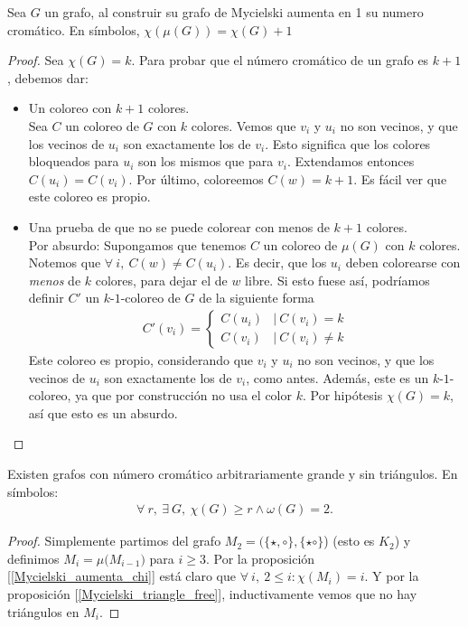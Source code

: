 \begin{proposition}\label{Mycielski_aumenta_chi}
Sea $G$ un grafo, al construir su grafo de Mycielski aumenta en 1 su numero cromático. En símbolos,
$\chi({\mu(G)}) = \chi(G) + 1$
\end{proposition}

\begin{proof}
Sea $\chi(G) = k$. Para probar que el número cromático de un grafo es $k+1$, debemos dar:
\begin{itemize}
    \item Un coloreo con $k+1$ colores.\\
    Sea $C$ un coloreo de $G$ con $k$ colores. Vemos que $v_i$ y $u_i$ no son vecinos, y que los vecinos de $u_i$ son exactamente los de $v_i$. Esto significa que los colores bloqueados para $u_i$ son los mismos que para $v_i$. Extendamos entonces $C(u_i) = C(v_i)$. Por último, coloreemos $C(w) = k+1$. Es fácil ver que este coloreo es propio.
    
    \item Una prueba de que no se puede colorear con menos de $k+1$ colores.\\
    Por absurdo: Supongamos que tenemos $C$ un coloreo de $\mu(G)$ con $k$ colores. Notemos que $\forall~ i,~ C(w) \neq C(u_i)$. Es decir, que los $u_i$ deben colorearse con \emph{menos} de $k$ colores, para dejar el de $w$ libre. Si esto fuese así, podríamos definir $C'$ un $k$-$1$-coloreo de $G$ de la siguiente forma
    \begin{align}
           C'(v_i) =
        \begin{cases}
            C(u_i) & |\ C(v_i) = k\\
            C(v_i) & |\ C(v_i) \neq k
        \end{cases}
    \end{align}
    Este coloreo es propio, considerando que $v_i$ y $u_i$ no son vecinos, y que los vecinos de $u_i$ son exactamente los de $v_i$, como antes.
    Además, este es un $k$-$1$-coloreo, ya que por construcción no usa el color $k$. Por hipótesis $\chi(G) = k$, así que esto es un absurdo.
\end{itemize}
\end{proof}

\begin{proposition}
Existen grafos con número cromático arbitrariamente grande y sin triángulos. En símbolos:
\begin{align}
    \forall~ r,~ \exists~ G,~ \chi(G) \ge r \wedge \omega(G) = 2.
\end{align}
\end{proposition}

\begin{proof}
Simplemente partimos del grafo $M_2 = (\{\star, \circ\}, \{\star\circ\}$) (esto es $K_2$) y definimos $M_i = \mu({M_{i-1})}$ para $i \ge 3$. Por la proposición [\ref{Mycielski_aumenta_chi}] está claro que $\forall~ i,~ 2 \le i : \chi(M_i) = i$. Y por la proposición [\ref{Mycielski_triangle_free}], inductivamente vemos que no hay triángulos en $M_i$.
\end{proof}
